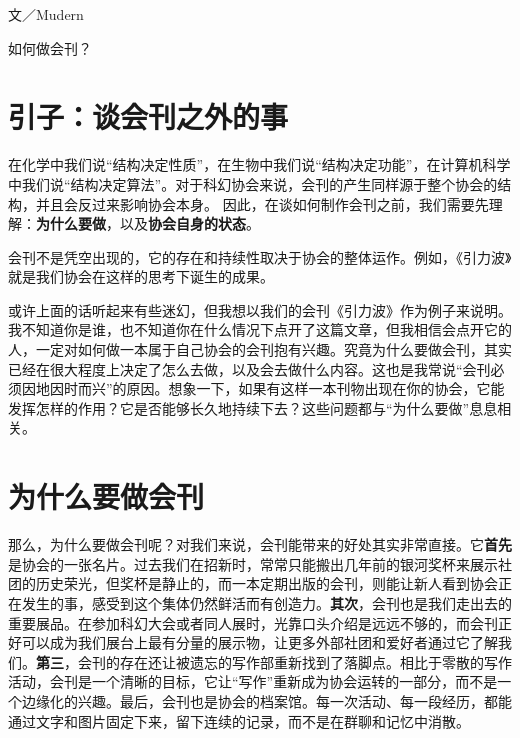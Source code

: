 \pagestyle{fancy}
\fancyhf{}
\fancyfoot[RO]{\thepage}
\fancyfoot[LE]{\thepage}
\renewcommand{\headrulewidth}{0pt}
\renewcommand{\footrulewidth}{0pt}
\setlength{\headheight}{15pt}


{\raggedright
  \fangsong 文／Mudern
}

\vspace{2mm}

{\raggedright
  \heiti 如何做会刊？
}

\vspace{2mm}
\section{引子：谈会刊之外的事}\label{ux5f15ux5b50ux8c08ux4f1aux520aux4e4bux5916ux7684ux4e8b}

在化学中我们说``结构决定性质''，在生物中我们说``结构决定功能''，在计算机科学中我们说``结构决定算法''。对于科幻协会来说，会刊的产生同样源于整个协会的结构，并且会反过来影响协会本身。
因此，在谈如何制作会刊之前，我们需要先理解：\textbf{为什么要做}，以及\textbf{协会自身的状态}。

会刊不是凭空出现的，它的存在和持续性取决于协会的整体运作。例如，《引力波》就是我们协会在这样的思考下诞生的成果。

或许上面的话听起来有些迷幻，但我想以我们的会刊《引力波》作为例子来说明。我不知道你是谁，也不知道你在什么情况下点开了这篇文章，但我相信会点开它的人，一定对如何做一本属于自己协会的会刊抱有兴趣。究竟为什么要做会刊，其实已经在很大程度上决定了怎么去做，以及会去做什么内容。这也是我常说``会刊必须因地因时而兴''的原因。想象一下，如果有这样一本刊物出现在你的协会，它能发挥怎样的作用？它是否能够长久地持续下去？这些问题都与``为什么要做''息息相关。

\section{为什么要做会刊}\label{ux4e3aux4ec0ux4e48ux8981ux505aux4f1aux520a}

那么，为什么要做会刊呢？对我们来说，会刊能带来的好处其实非常直接。它\textbf{首先}是协会的一张名片。过去我们在招新时，常常只能搬出几年前的银河奖杯来展示社团的历史荣光，但奖杯是静止的，而一本定期出版的会刊，则能让新人看到协会正在发生的事，感受到这个集体仍然鲜活而有创造力。\textbf{其次}，会刊也是我们走出去的重要展品。在参加科幻大会或者同人展时，光靠口头介绍是远远不够的，而会刊正好可以成为我们展台上最有分量的展示物，让更多外部社团和爱好者通过它了解我们。\textbf{第三}，会刊的存在还让被遗忘的写作部重新找到了落脚点。相比于零散的写作活动，会刊是一个清晰的目标，它让``写作''重新成为协会运转的一部分，而不是一个边缘化的兴趣。最后，会刊也是协会的档案馆。每一次活动、每一段经历，都能通过文字和图片固定下来，留下连续的记录，而不是在群聊和记忆中消散。


